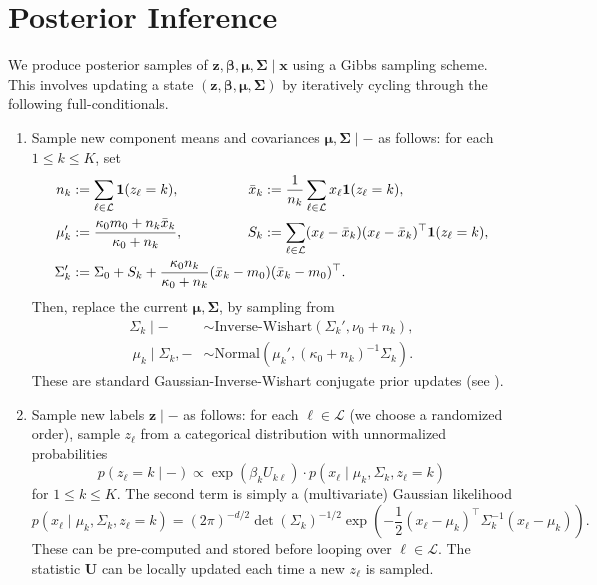 \documentclass[12pt]{article}
\newcommand{\LL}{\mathcal{L}}
\begin{document}






\appendix




\section{Posterior Inference}
\label{sec:inference}

We produce posterior samples of $\bm{z}, \bm{\beta}, \bm{\mu}, \bm{\Sigma} \mid
\bm{x}$ using a Gibbs sampling scheme.
This involves updating a state $(\bm{z}, \bm{\beta}, \bm{\mu}, \bm{\Sigma})$ by
iteratively cycling through the following full-conditionals.
\begin{enumerate}[label=(\alph*)]
    \item Sample new component means and covariances $\bm{\mu}, \bm{\Sigma}
    \mid - $ as follows: for each $1 \leq k \leq K$, set \begin{align*}
        n_k &:= \sum_{\ell \in \LL} \bm{1}(z_\ell = k), &
        \bar{x}_k &:= \frac{1}{n_k}\sum_{\ell \in \LL} x_\ell \bm{1}(z_\ell = k), \\
        \mu_k'&:= \frac{\kappa_0 m_0 + n_k \bar{x}_k}{\kappa_0 + n_k}, &
        S_k &:= \sum_{\ell \in \LL} (x_\ell - \bar{x}_k)(x_\ell - \bar{x}_k)^\top \bm{1}(z_\ell = k), \\
        \Sigma_k' &:= \Sigma_0 + S_k + \frac{\kappa_0 n_k}{\kappa_0 + n_k} (\bar{x}_k - m_0)(\bar{x}_k - m_0)^\top. \hspace{-8em}
    \end{align*}
    Then, replace the current $\bm{\mu}, \bm{\Sigma}$, by sampling from \begin{align*}
        \Sigma_k \mid -
            &\sim \text{Inverse-Wishart}\left(\Sigma_k', \nu_0 + n_k\right), \\\
        \mu_k \mid \Sigma_k, -
            &\sim \text{Normal}\left(\mu_k', (\kappa_0 + n_k)^{-1}\Sigma_k\right).
    \end{align*}
    These are standard Gaussian-Inverse-Wishart conjugate prior updates (see
    \cite{hoff2009}).

    \item Sample new labels $\bm{z} \mid -$ as follows: for each $\ell \in
    \LL$ (we choose a randomized order), sample $z_\ell$ from a
    categorical distribution with unnormalized probabilities \[
        p(z_\ell = k \mid -)
            \propto \exp\left(\beta_k U_{k\ell}\right)\cdot p(x_\ell \mid \mu_k, \Sigma_k, z_\ell = k)
    \] for $1 \leq k \leq K$.
    The second term is simply a (multivariate) Gaussian likelihood \[
        p(x_\ell \mid \mu_k, \Sigma_k, z_\ell = k)
            = (2\pi)^{-d/2}\det(\Sigma_k)^{-1 /2}\exp\left(-\frac{1}{2}(x_\ell - \mu_k)^\top \Sigma_k^{-1}(x_\ell - \mu_k)\right).
    \] These can be pre-computed and stored before looping over $\ell \in \LL$.
    The statistic $\bm{U}$ can be locally updated each time a new $z_\ell$ is
    sampled.


\end{enumerate}
\end{document}
